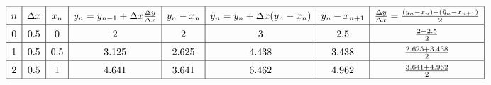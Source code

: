 \documentclass[a4paper,12pt]{article}
\begin{document}
\[\def\arraystretch{1.5}
\begin{array}{|c|c|c|c|c|c|c|c|}
	\hline
	n&\Delta x&x_n&y_n=y_{n-1}+\Delta x\frac{\Delta y}{\Delta x}&y_n-x_n&\tilde{y}_n=y_n+\Delta x(y_n-x_n)&\tilde{y}_n-x_{n+1}&\frac{\Delta y}{\Delta x}=\frac{(y_n-x_n)+(\tilde{y}_n-x_{n+1})}2\\
	\hline
	0&0.5&0&2&2&3&2.5&\frac{2+2.5}2\\
	\hline
	1&0.5&0.5&3.125&2.625&4.438&3.438&\frac{2.625+3.438}2\\
	\hline
	2&0.5&1&4.641&3.641&6.462&4.962&\frac{3.641+4.962}2\\
	\hline
\end{array}\]
\end{document}
